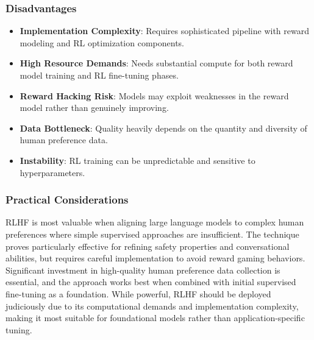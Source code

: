 \subsubsection{Disadvantages}
\begin{itemize}
    \item \textbf{Implementation Complexity}: Requires sophisticated pipeline with reward modeling and RL optimization components.
    
    \item \textbf{High Resource Demands}: Needs substantial compute for both reward model training and RL fine-tuning phases.
    
    \item \textbf{Reward Hacking Risk}: Models may exploit weaknesses in the reward model rather than genuinely improving.
    
    \item \textbf{Data Bottleneck}: Quality heavily depends on the quantity and diversity of human preference data.
    
    \item \textbf{Instability}: RL training can be unpredictable and sensitive to hyperparameters.
\end{itemize}

\subsubsection{Practical Considerations}
RLHF is most valuable when aligning large language models to complex human preferences where simple supervised approaches are insufficient. The technique proves particularly effective for refining safety properties and conversational abilities, but requires careful implementation to avoid reward gaming behaviors. Significant investment in high-quality human preference data collection is essential, and the approach works best when combined with initial supervised fine-tuning as a foundation. While powerful, RLHF should be deployed judiciously due to its computational demands and implementation complexity, making it most suitable for foundational models rather than application-specific tuning.

\newpage 
